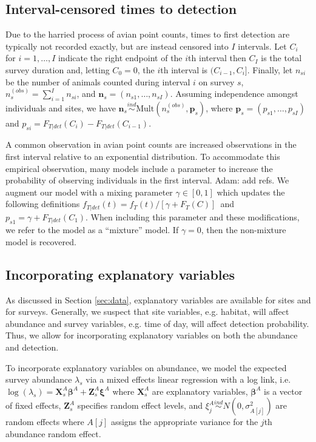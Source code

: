 \documentclass[useAMS,usenatbib,referee,12pt]{article}
\newcommand{\jarad}[1]{{\color{Orange} #1}}
\newcommand{\vn}{\textbf{n}}
\newcommand{\vp}{\textbf{p}}
\newcommand{\vX}{\textbf{X}}
\newcommand{\vZ}{\textbf{Z}}
\newcommand{\vbeta}{\boldsymbol{\beta}}
\newcommand{\vxi}{\boldsymbol{\xi}}
\newcommand{\Mult}{\mbox{Mult}}
\newcommand{\ind}{\stackrel{ind}{\sim}}
\begin{document}
\subsection{Interval-censored times to detection}

Due to the harried process of avian point counts, times to first detection are typically not recorded exactly, but are instead censored into $I$ intervals. 
Let $C_i$ for $i=1,\dots,I$ indicate the right endpoint of the $i$th interval then $C_I$ is the total survey duration and, letting $C_0=0$, the $i$th interval is $(C_{i-1},C_{i}]$. 
Finally, let $n_{si}$ be the number of animals counted during interval $i$ on survey $s$, $n_{s}^{(obs)} = \sum_{i=1}^I n_{si}$, and $\vn_{s}=(n_{s1},\dots,n_{sI})$.
Assuming independence amongst individuals and sites, we have $\vn_{s} \ind \Mult \left(n_{s}^{(obs)}, \vp_{s}\right)$, where $\vp_{s}=(p_{s1},\dots,p_{sI})$ and $p_{si} = F_{T|det}(C_i) - F_{T|det}(C_{i-1})$.  

A common observation in avian point counts are increased observations in the first interval relative to an exponential distribution.
To accommodate this empirical observation, many models include a parameter to increase the probability of observing individuals in the first interval. \jarad{Adam: add refs.}
We augment our model with a mixing parameter $\gamma\in[0,1]$ which updates the following definitions
$f_{T|det}(t) = f_T(t)/[\gamma+F_T(C)]$\ and $p_{s1} = \gamma + F_{T|det}(C_1)$.
When including this parameter and these modifications, we refer to the model as a ``mixture'' model. 
If $\gamma=0$, then the non-mixture model is recovered.





\subsection{Incorporating explanatory variables}\label{sec:covariates}

As discussed in Section \ref{sec:data}, explanatory variables are available for sites and for surveys. 
Generally, we suspect that site variables, e.g. habitat, will affect abundance and survey variables, e.g. time of day, will affect detection probability. 
Thus, we allow for incorporating explanatory variables on both the abundance and detection.

To incorporate explanatory variables on abundance, we model the expected survey abundance $\lambda_{s}$ via a mixed effects linear regression with a log link, i.e. $\log (\lambda_{s}) = \vX_{s}^A\vbeta^A + \vZ_{s}^A\vxi^A$ where $\vX_{s}^A$ are explanatory variables, $\vbeta^A$ is a vector of fixed effects, $\vZ_{s}^A$ specifies random effect levels, and $\xi_j^A \ind N(0,\sigma_{A[j]}^2)$ are random effects where $A[j]$ assigns the appropriate variance for the $j$th abundance random effect.  
\end{document}
